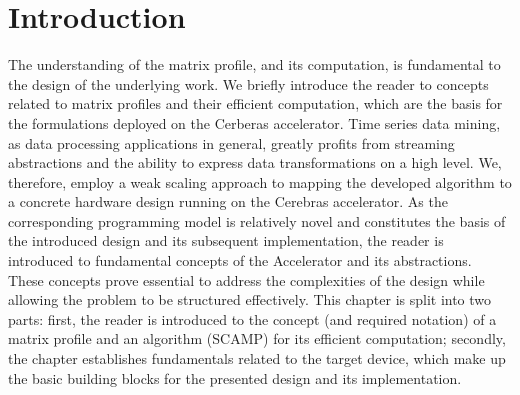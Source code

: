 
\chapter{Introduction}\label{chapter:introduction}

The understanding of the matrix profile, and its computation, is fundamental to the
design of the underlying work. We briefly introduce the reader to concepts related to
matrix profiles and their efficient computation, which are the basis for the formulations
deployed on the Cerberas accelerator. Time series data mining, as data processing applications in
general, greatly profits from streaming abstractions and the ability to express data
transformations on a high level. We, therefore, employ a weak scaling approach to mapping the developed algorithm to a concrete hardware design running
on the Cerebras accelerator. As the corresponding programming model is relatively novel and
constitutes the basis of the introduced design and its subsequent implementation,
the reader is introduced to fundamental concepts of the Accelerator and its abstractions. These
concepts prove essential to address the complexities of the design while allowing the
problem to be structured effectively.
This chapter is split into two parts: first, the reader is introduced to the concept
(and required notation) of a matrix profile and an algorithm (SCAMP) for its efficient
computation; secondly, the chapter establishes fundamentals related to the target device, which make up the basic building blocks for the presented design and its implementation.
